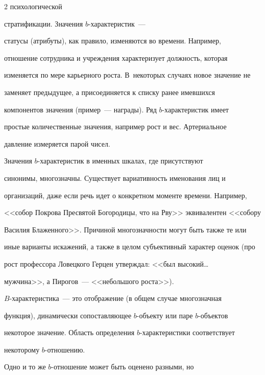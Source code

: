 \begin{multicols}{2}
психологической~\cite{15mar}\linebreak


стратификации. Значения $b$-характеристик~---\linebreak 


статусы (атрибуты), как правило, изменяются во времени. Например, 


отношение сотрудника и учреж\-де\-ния характеризует должность, которая 


изменяется по мере карьерного роста. В~некоторых случаях новое значение не 


заменяет предыдущее, а присоединяется к списку ранее имевшихся 


компонентов значения (пример~--- награды). Ряд $b$-ха\-рак\-те\-ри\-стик имеет 


простые количественные значения, например рост и вес. Артериальное 


давление измеряется парой чисел.


  


  Значения $b$-характеристик в именных шкалах, где присутствуют 


синонимы, многозначны. Существует вариативность именования лиц и 


организаций, даже если речь идет о конкретном моменте времени. Например, 


<<собор Покрова Пресвятой Богородицы, что на Рву>> эквивалентен <<собору 


Василия Блаженного>>. Причиной многозначности могут быть также те или 


иные варианты искажений, а также в целом субъективный характер оценок (про 


рост профессора Ловецкого Герцен утверждал: <<был высокий\ldots\ 


мужчина>>, а Пирогов~--- <<небольшого роста>>).


  


  $B$-характеристика~--- это отображение (в общем случае многозначная 


функция), динамически сопоставляющее $b$-объек\-ту или паре $b$-объек\-тов 


некоторое значение. Область определения $b$-ха\-рак\-те\-рис\-ти\-ки соответствует 


некоторому $b$-от\-но\-шению.


  


  Одно и то же $b$-отношение может быть оценено разными, но 



\end{multicols}
